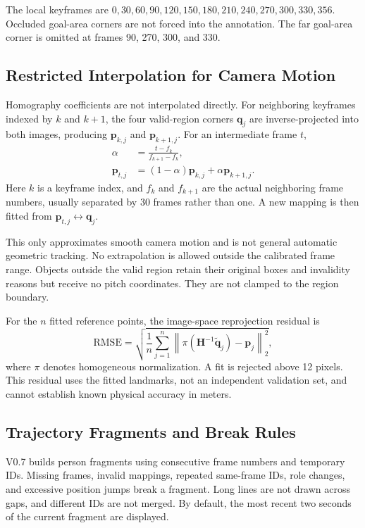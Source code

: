 \documentclass[11pt,a4paper]{article}
\begin{document}
The local keyframes are
$0,30,60,90,120,150,180,210,240,270,300,330,356$.
Occluded goal-area corners are not forced into the annotation.
The far goal-area corner is omitted at frames 90, 270, 300, and 330.

\subsection{Restricted Interpolation for Camera Motion}

Homography coefficients are not interpolated directly.
For neighboring keyframes indexed by $k$ and $k+1$, the four valid-region
corners $\mathbf{q}_j$ are inverse-projected into both images, producing
$\mathbf{p}_{k,j}$ and $\mathbf{p}_{k+1,j}$.
For an intermediate frame $t$,
\begin{align}
 \alpha &=\frac{t-f_k}{f_{k+1}-f_k},\\
 \mathbf{p}_{t,j}
   &=(1-\alpha)\mathbf{p}_{k,j}+\alpha\mathbf{p}_{k+1,j}.
\end{align}
Here $k$ is a keyframe index, and $f_k$ and $f_{k+1}$ are the actual neighboring
frame numbers, usually separated by 30 frames rather than one.
A new mapping is then fitted from
$\mathbf{p}_{t,j}\leftrightarrow\mathbf{q}_j$.

This only approximates smooth camera motion and is not general automatic
geometric tracking. No extrapolation is allowed outside the calibrated frame
range. Objects outside the valid region retain their original boxes and
invalidity reasons but receive no pitch coordinates. They are not clamped
to the region boundary.

For the $n$ fitted reference points, the image-space reprojection residual is
\begin{equation}
 \mathrm{RMSE}
 =\sqrt{\frac1n\sum_{j=1}^{n}
   \left\|\pi(\mathbf{H}^{-1}\widetilde{\mathbf{q}}_j)
           -\mathbf{p}_j\right\|_2^2},
\end{equation}
where $\pi$ denotes homogeneous normalization.
A fit is rejected above 12 pixels. This residual uses the fitted landmarks,
not an independent validation set, and cannot establish known physical
accuracy in meters.

\subsection{Trajectory Fragments and Break Rules}

V0.7 builds person fragments using consecutive frame numbers and temporary IDs.
Missing frames, invalid mappings, repeated same-frame IDs, role changes,
and excessive position jumps break a fragment. Long lines are not drawn across
gaps, and different IDs are not merged. By default, the most recent two seconds
of the current fragment are displayed.
\end{document}
